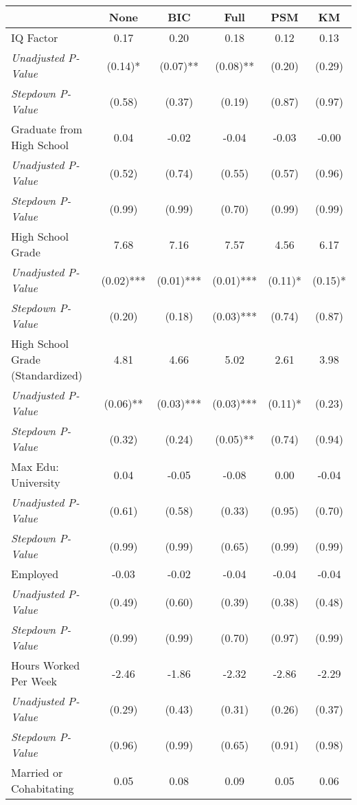 \begin{tabular}{l c c c c c}
\toprule
 & None & BIC & Full & PSM & KM \\
\midrule
IQ Factor & 0.17 & 0.20 & 0.18 & 0.12 & 0.13 \\
\quad \textit{Unadjusted P-Value} & (0.14)* & (0.07)** & (0.08)** & (0.20) & (0.29) \\
\quad \textit{Stepdown P-Value} & (0.58) & (0.37) & (0.19) & (0.87) & (0.97) \\
Graduate from High School & 0.04 & -0.02 & -0.04 & -0.03 & -0.00 \\
\quad \textit{Unadjusted P-Value} & (0.52) & (0.74) & (0.55) & (0.57) & (0.96) \\
\quad \textit{Stepdown P-Value} & (0.99) & (0.99) & (0.70) & (0.99) & (0.99) \\
High School Grade & 7.68 & 7.16 & 7.57 & 4.56 & 6.17 \\
\quad \textit{Unadjusted P-Value} & (0.02)*** & (0.01)*** & (0.01)*** & (0.11)* & (0.15)* \\
\quad \textit{Stepdown P-Value} & (0.20) & (0.18) & (0.03)*** & (0.74) & (0.87) \\
High School Grade (Standardized) & 4.81 & 4.66 & 5.02 & 2.61 & 3.98 \\
\quad \textit{Unadjusted P-Value} & (0.06)** & (0.03)*** & (0.03)*** & (0.11)* & (0.23) \\
\quad \textit{Stepdown P-Value} & (0.32) & (0.24) & (0.05)** & (0.74) & (0.94) \\
Max Edu: University & 0.04 & -0.05 & -0.08 & 0.00 & -0.04 \\
\quad \textit{Unadjusted P-Value} & (0.61) & (0.58) & (0.33) & (0.95) & (0.70) \\
\quad \textit{Stepdown P-Value} & (0.99) & (0.99) & (0.65) & (0.99) & (0.99) \\
Employed & -0.03 & -0.02 & -0.04 & -0.04 & -0.04 \\
\quad \textit{Unadjusted P-Value} & (0.49) & (0.60) & (0.39) & (0.38) & (0.48) \\
\quad \textit{Stepdown P-Value} & (0.99) & (0.99) & (0.70) & (0.97) & (0.99) \\
Hours Worked Per Week & -2.46 & -1.86 & -2.32 & -2.86 & -2.29 \\
\quad \textit{Unadjusted P-Value} & (0.29) & (0.43) & (0.31) & (0.26) & (0.37) \\
\quad \textit{Stepdown P-Value} & (0.96) & (0.99) & (0.65) & (0.91) & (0.98) \\
Married or Cohabitating & 0.05 & 0.08 & 0.09 & 0.05 & 0.06 \\

\end{tabular}
